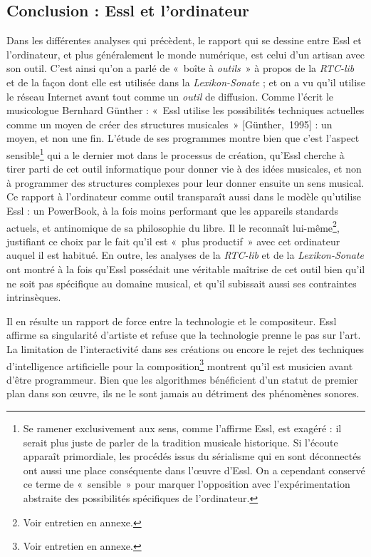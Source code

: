\documentclass[a4paper,12pt]{article}
\newcommand{\guill}[1]{«~#1~»}
\newcommand{\cicite}[1]{{\footnotesize[#1]}}
\begin{document}
\subsection{Conclusion : Essl et l'ordinateur}

Dans les différentes analyses qui précèdent, le rapport qui se dessine entre Essl et l'ordinateur, et plus généralement le monde numérique, est celui d'un artisan avec son outil. C'est ainsi qu'on a parlé de \guill{boîte à \emph{outils}} à propos de la \emph{RTC-lib} et de la façon dont elle est utilisée dans la \emph{Lexikon-Sonate} ; et on a vu qu'il utilise le réseau Internet avant tout comme un \emph{outil} de diffusion. Comme l'écrit le musicologue Bernhard Günther : \guill{Essl utilise les possibilités techniques actuelles comme un moyen de créer des structures musicales} \cicite{Günther,~1995} : un moyen, et non une fin. L'étude de ses programmes montre bien que c'est l'aspect sensible\footnote{Se ramener exclusivement aux sens, comme l'affirme Essl, est exagéré : il serait plus juste de parler de la tradition musicale historique. Si l'écoute apparaît primordiale, les procédés issus du sérialisme qui en sont déconnectés ont aussi une place conséquente dans l'œuvre d'Essl. On a cependant conservé ce terme de \guill{sensible} pour marquer l'opposition avec l'expérimentation abstraite des possibilités spécifiques de l'ordinateur.} qui a le dernier mot dans le processus de création, qu'Essl cherche à tirer parti de cet outil informatique pour donner vie à des idées musicales, et non à programmer des structures complexes pour leur donner ensuite un sens musical. Ce rapport à l'ordinateur comme outil transparaît aussi dans le modèle qu'utilise Essl : un PowerBook, à la fois moins performant que les appareils standards actuels, et antinomique de sa philosophie du libre. Il le reconnaît lui-même\footnote{Voir entretien en annexe.}, justifiant ce choix par le fait qu'il est \guill{plus productif} avec cet ordinateur auquel il est habitué. En outre, les analyses de la \emph{RTC-lib} et de la \emph{Lexikon-Sonate} ont montré à la fois qu'Essl possédait une véritable maîtrise de cet outil bien qu'il ne soit pas spécifique au domaine musical, et qu'il subissait aussi ses contraintes intrinsèques.

Il en résulte un rapport de force entre la technologie et le compositeur. Essl affirme sa singularité d'artiste et refuse que la technologie prenne le pas sur l'art. La limitation de l'interactivité dans ses créations ou encore le rejet des techniques d'intelligence artificielle pour la composition\footnote{Voir entretien en annexe.} montrent qu'il est musicien avant d'être programmeur. Bien que les algorithmes bénéficient d'un statut de premier plan dans son œuvre, ils ne le sont jamais au détriment des phénomènes sonores.
\end{document}
